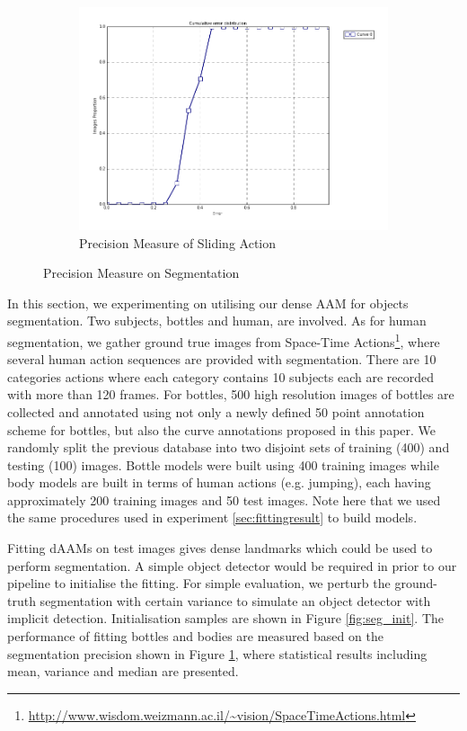 \begin{figure}[h]
\begin{subfigure}[b]{0.1\textwidth}
            \includegraphics[width=\textwidth]{supports/Segmentation_Measure/body_slide_seg}
        \caption{Precision Measure of Sliding Action}
    \end{subfigure}
    \caption{Precision Measure on Segmentation}
    \label{fig:seg_result}
\end{figure}

In this section, we experimenting on utilising our dense AAM for objects segmentation. Two subjects, bottles and human, are involved. As for human segmentation, we gather ground true images from Space-Time Actions\footnote{\label{sta} \url{http://www.wisdom.weizmann.ac.il/~vision/SpaceTimeActions.html}}\cite{ActionsAsSpaceTimeShapes_iccv05]}, where several human action sequences are provided with segmentation. There are 10 categories actions where each category contains 10 subjects each are recorded with more than 120 frames. For bottles, 500 high resolution images of bottles are collected and annotated using not only a newly defined 50 point annotation scheme for bottles, but also the curve annotations proposed in this paper. We randomly split the previous database into two disjoint sets of training (400) and testing (100) images. Bottle models were built using 400 training images while body models are built in terms of human actions (e.g. jumping), each having approximately 200 training images and 50 test images. Note here that we used the same procedures used in experiment \ref{sec:fittingresult} to build models. 

Fitting dAAMs on test images gives dense landmarks which could be used to perform segmentation. A simple object detector would be required in prior to our pipeline to initialise the fitting. For simple evaluation, we perturb the ground-truth segmentation with certain variance to simulate an object detector with implicit detection. Initialisation samples are shown in Figure \ref{fig:seg_init}. The performance of fitting bottles and bodies are measured based on the segmentation precision shown in Figure \ref{fig:seg_result}, where statistical results including mean, variance and median are presented.
    
{\small


}

